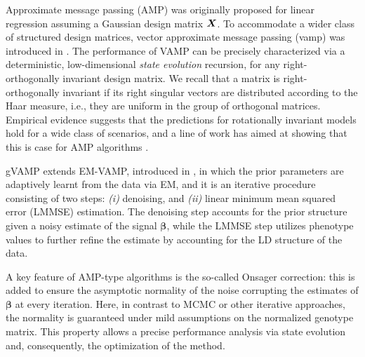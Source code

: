 Approximate message passing (AMP) was originally proposed for linear regression \cite{DMM09, Bayati2011, krzakala2012} assuming a Gaussian design matrix ${\boldsymbol X}$. To accommodate a wider class of structured design matrices, vector approximate message passing (\gls{vamp}) was introduced in \cite{schniter_vector_2016}. The performance of VAMP can be precisely characterized via a deterministic, low-dimensional \emph{state evolution} recursion, for any right-orthogonally invariant design matrix. We recall that a matrix is right-orthogonally invariant if its right singular vectors are distributed according to the Haar measure, i.e., they are uniform in the group of orthogonal matrices. Empirical evidence \cite{donoho2009observed, monajemi2013deterministic} suggests that the predictions for rotationally invariant models hold for a wide class of scenarios, and a line of work  has aimed at showing that this is case for AMP algorithms \cite{Wang22AMPUniversality, dudeja2022universality}.

gVAMP extends EM-VAMP, introduced in \cite{LearningFreeEnergies2018, RigorousDynamics2017}, in which the prior parameters are adaptively learnt from the data via EM, and it is an iterative procedure consisting of two steps: \emph{(i)} denoising, and \emph{(ii)} linear minimum mean squared error (LMMSE) estimation. The denoising step accounts for the prior structure given a noisy estimate of the signal $\bm{\beta}$, while the LMMSE step utilizes phenotype values to further refine the estimate by accounting for the LD structure of the data.

A key feature of AMP-type algorithms is the so-called Onsager correction: this is added to ensure the asymptotic normality of the noise corrupting the estimates of $\bm{\beta}$ at every iteration. Here, in contrast to MCMC or other iterative approaches, the normality is guaranteed under mild assumptions on the normalized genotype matrix. This property allows a precise performance analysis via state evolution and, consequently, the optimization of the method.

